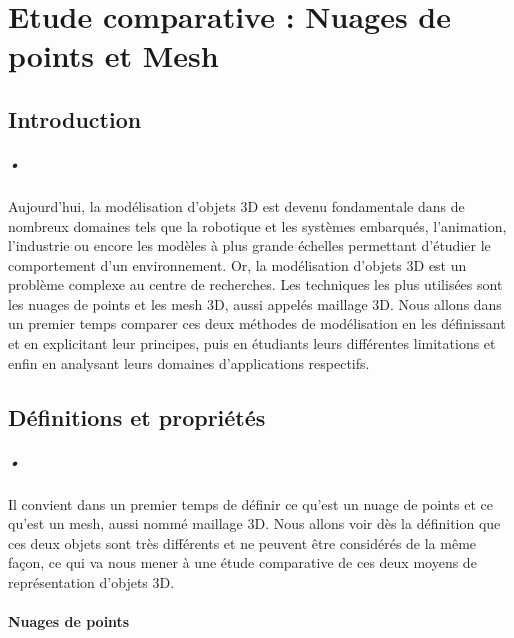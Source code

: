 

\chapter{Etude comparative : Nuages de points et Mesh}

\section{Introduction}

\paragraph{•} Aujourd'hui, la modélisation d'objets 3D est devenu fondamentale dans de nombreux domaines tels que la robotique et les systèmes embarqués, l'animation, l'industrie ou encore les modèles à plus grande échelles permettant d'étudier le comportement d'un environnement. Or, la modélisation d'objets 3D est un problème complexe au centre de recherches. Les techniques les plus utilisées sont les nuages de points et les mesh 3D, aussi appelés maillage 3D. Nous allons dans un premier temps comparer ces deux méthodes de modélisation en les définissant et en explicitant leur principes, puis en étudiants leurs différentes limitations et enfin en analysant leurs domaines d'applications respectifs.



\section{Définitions et propriétés}

\paragraph{•} Il convient dans un premier temps de définir ce qu'est un nuage de points et ce qu'est un mesh, aussi nommé maillage 3D. Nous allons voir dès la définition que ces deux objets sont très différents et ne peuvent être considérés de la même façon, ce qui va nous mener à une étude comparative de ces deux moyens de représentation d'objets 3D.

\subsubsection{Nuages de points}
